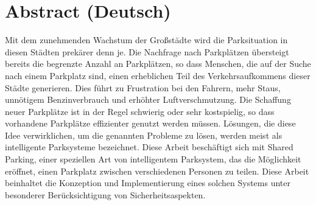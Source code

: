 \section*{Abstract (Deutsch)}
Mit dem zunehmenden Wachstum der Großstädte wird die Parksituation in diesen Städten prekärer denn je. Die Nachfrage nach Parkplätzen übersteigt bereits die begrenzte Anzahl an Parkplätzen, so dass Menschen, die auf der Suche nach einem Parkplatz sind, einen erheblichen Teil des Verkehrsaufkommens dieser Städte generieren. Dies führt zu Frustration bei den Fahrern, mehr Staus, unnötigem Benzinverbrauch und erhöhter Luftverschmutzung. Die Schaffung neuer Parkplätze ist in der Regel schwierig oder sehr kostspielig, so dass vorhandene Parkplätze effizienter genutzt werden müssen. Lösungen, die diese Idee verwirklichen, um die genannten Probleme zu lösen, werden meist als intelligente Parksysteme bezeichnet. Diese Arbeit beschäftigt sich mit Shared Parking, einer speziellen Art von intelligentem Parksystem, das die Möglichkeit eröffnet, einen Parkplatz zwischen verschiedenen Personen zu teilen. Diese Arbeit beinhaltet die Konzeption und Implementierung eines solchen Systems unter besonderer Berücksichtigung von Sicherheitsaspekten.
